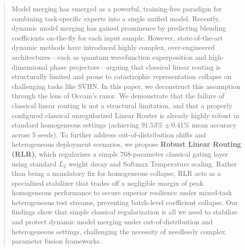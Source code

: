 \begin{abstract}
Model merging has emerged as a powerful, training-free paradigm for combining task-specific experts into a single unified model. Recently, dynamic model merging has gained prominence by predicting blending coefficients on-the-fly for each input sample. However, state-of-the-art dynamic methods have introduced highly complex, over-engineered architectures---such as quantum wavefunction superposition and high-dimensional phase projectors---arguing that classical linear routing is structurally limited and prone to catastrophic representation collapse on challenging tasks like SVHN. In this paper, we deconstruct this assumption through the lens of Occam's razor. We demonstrate that the failure of classical linear routing is not a structural limitation, and that a properly configured classical unregularized Linear Router is already highly robust in standard homogeneous settings (achieving $91.53\% \pm 0.41\%$ mean accuracy across 5 seeds). To further address out-of-distribution shifts and heterogeneous deployment scenarios, we propose \textbf{Robust Linear Routing (RLR)}, which regularizes a simple 768-parameter classical gating layer using standard $L_2$ weight decay and Softmax Temperature scaling. Rather than being a mandatory fix for homogeneous collapse, RLR acts as a specialized stabilizer that trades off a negligible margin of peak homogeneous performance to secure superior resilience under mixed-task heterogeneous test streams, preventing batch-level coefficient collapse. Our findings show that simple classical regularization is all we need to stabilize and protect dynamic model merging under out-of-distribution and heterogeneous settings, challenging the necessity of needlessly complex parameter fusion frameworks.
\end{abstract}
